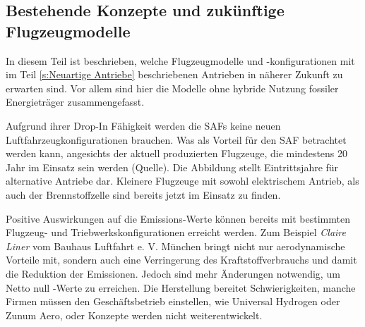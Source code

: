\subsection{Bestehende Konzepte und zukünftige Flugzeugmodelle}
In diesem Teil ist beschrieben, welche Flugzeugmodelle und -konfigurationen 
mit im Teil \ref{s:Neuartige Antriebe} beschriebenen Antrieben in näherer Zukunft zu erwarten sind. 
Vor allem sind hier die Modelle ohne hybride Nutzung fossiler Energieträger zusammengefasst.

Aufgrund ihrer Drop-In Fähigkeit werden die SAFs keine neuen Luftfahrzeugkonfigurationen brauchen. 
Was als Vorteil für den SAF betrachtet werden kann, angesichts der aktuell produzierten Flugzeuge, 
die mindestens 20 Jahr im Einsatz sein werden (Quelle).
Die Abbildung stellt Eintrittsjahre für alternative Antriebe dar.
Kleinere Flugzeuge mit sowohl elektrischem Antrieb, als auch der Brennstoffzelle sind bereits jetzt im Einsatz zu finden.

%
Positive Auswirkungen auf die Emissions-Werte können bereits mit bestimmten 
Flugzeug- und Triebwerkskonfigurationen erreicht werden.
Zum Beispiel \textit{Claire Liner} vom Bauhaus Luftfahrt e. V. München 
bringt nicht nur aerodynamische Vorteile mit, sondern auch eine Verringerung 
des Kraftstoffverbrauchs und damit die Reduktion der Emissionen.
Jedoch sind mehr Änderungen notwendig, um Netto null -Werte zu erreichen.
Die Herstellung bereitet Schwierigkeiten, manche Firmen müssen den Geschäftsbetrieb einstellen, 
wie Universal Hydrogen oder Zunum Aero, oder Konzepte werden nicht weiterentwickelt.

